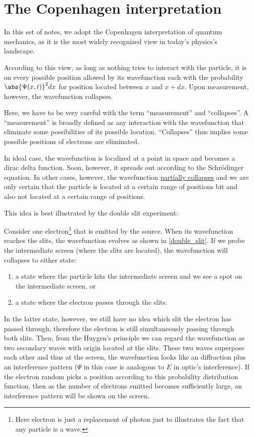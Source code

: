 \documentclass[a4paper,12pt]{report}
\begin{document}
\section{The Copenhagen interpretation}
	
In this set of notes, we adopt the Copenhagen interpretation of quantum mechanics, as it is the most widely recognized view in today's physics's landscape. 

According to this view, as long as nothing tries to interact with the particle, it is on every possible position allowed by its wavefunction each with the probability \(\abs{\Psi(x,t)}^2 dx\) for position located between \(x\) and \(x + dx\). Upon measurement, however, the wavefunction collapses.

Here, we have to be very careful with the term ``measurement'' and ``collapses''. A ``measurement'' is broadly defined as any interaction with the wavefunction that eliminate some possibilities of its possible location. ``Collapses'' thus implies some possible positions of electrons are eliminated.

In ideal case, the wavefunction is localized at a point in space and becomes a dirac delta function. Soon, however, it spreads out according to the Schrödinger equation. In other cases, however, the wavefunction \href{https://arxiv.org/pdf/2106.00466}{partially collapses} and we are only certain that the particle is located at a certain range of positions bit and also not located at a certain range of positions.

This idea is best illustrated by the double slit experiment: 

Consider one electron\footnote{Here electron is just a replacement of photon just to illustrates the fact that any particle is a wave.} that is emitted by the source. When its wavefunction reaches the slits, the wavefunction evolves as shown in \cref{double_slit}. If we probe the intermediate screen (where the slits are located), the wavefunction will collapses to either state: 

\begin{enumerate}
  \item a state where the particle hits the intermediate screen and we see a spot on the intermediate screen, or
  \item a state where the electron passes through the slits.
\end{enumerate}

In the latter state, however, we still have no idea which slit the electron has passed through, therefore the electron is still simultaneously passing through both slits. Then, from the Huygen's principle we can regard the wavefunction as two secondary waves with origin located at the slits. These two waves superpose each other and thus at the screen, the wavefunction looks like an diffraction plus an interference pattern (\(\Psi\) in this case is analogous to \(E\) in optic's interference). If the electron random picks a position according to this probability distribution function, then as the number of electrons emitted becomes sufficiently large, an interference pattern will be shown on the screen.
\end{document}
